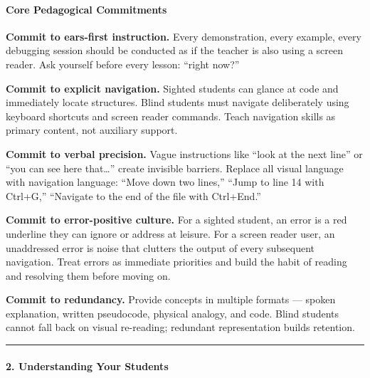 \documentclass[
  justified,
  openright,
]{tufte-book}
\let\subsection\paragraph
\let\paragraph\paragraph
\let\subsection\paragraph
\let\paragraph\paragraph
\begin{document}
\subsection{Core Pedagogical
Commitments}\label{core-pedagogical-commitments}

\textbf{Commit to ears-first instruction.} Every demonstration, every
example, every debugging session should be conducted as if the teacher
is also using a screen reader. Ask yourself before every lesson:  ``right
now?''

\textbf{Commit to explicit navigation.} Sighted students can glance at
code and immediately locate structures. Blind students must navigate
deliberately using keyboard shortcuts and screen reader commands. Teach
navigation skills as primary content, not auxiliary support.

\textbf{Commit to verbal precision.} Vague instructions like ``look at
the next line'' or ``you can see here that\ldots{}'' create invisible
barriers. Replace all visual language with navigation language: ``Move
down two lines,'' ``Jump to line 14 with Ctrl+G,'' ``Navigate to the end
of the file with Ctrl+End.''

\textbf{Commit to error-positive culture.} For a sighted student, an
error is a red underline they can ignore or address at leisure. For a
screen reader user, an unaddressed error is noise that clutters the
output of every subsequent navigation. Treat errors as immediate
priorities and build the habit of reading and resolving them before
moving on.

\textbf{Commit to redundancy.} Provide concepts in multiple formats ---
spoken explanation, written pseudocode, physical analogy, and code.
Blind students cannot fall back on visual re-reading; redundant
representation builds retention.

\begin{center}\rule{0.5\linewidth}{0.5pt}\end{center}

\subsection{2. Understanding Your
Students}\label{understanding-your-students}
\end{document}
